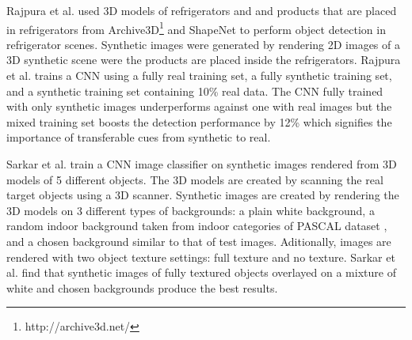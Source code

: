Rajpura et al. \cite{rajpura2017object} used 3D models of refrigerators and and products that are placed in refrigerators from Archive3D\footnote{http://archive3d.net/} and ShapeNet \cite{chang2015shapenet} to perform object detection in refrigerator scenes. Synthetic images were generated by rendering 2D images of a 3D synthetic scene were the products are placed inside the refrigerators. Rajpura et al. trains a CNN using a fully real training set, a fully synthetic training set, and a synthetic training set containing 10\% real data. The CNN fully trained with only synthetic images  underperforms against one with real images but the mixed training set boosts the detection performance by 12\% which signifies the importance of transferable cues from synthetic to real.

Sarkar et al. \cite{sarkar2017trained} train a CNN image classifier on synthetic images rendered from 3D models of 5 different objects. The 3D models are created by scanning the real target objects using a 3D scanner. Synthetic images are created by rendering the 3D models on 3 different types of backgrounds: a plain white background, a random indoor background taken from indoor categories of PASCAL dataset \cite{everingham2010pascal}, and a chosen background similar to that of test images. Aditionally, images are rendered with two object texture settings: full texture and no texture. Sarkar et al. find that synthetic images of fully textured objects overlayed on a mixture of white and chosen backgrounds produce the best results.
